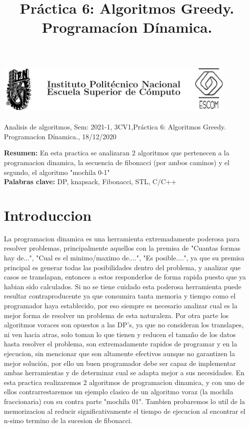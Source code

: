 \documentclass[spanish]{article}
\title {Práctica  6: Algoritmos Greedy. Programacíon Dínamica.}
\begin{document}
	\centerline{\includegraphics[width=450px,height=100px]{header}}
	\centerline{Analisis de algoritmos, Sem: 2021-1, 3CV1,Práctica  6: Algoritmos Greedy. Programacíon Dínamica., 18/12/2020}
	\centerline{}
	\bigskip
	\justify
	\textbf{Resumen:}	
	En esta practica se analizaran 2 algoritmos que pertenecen a la programacion dinamica, la secuencia de fibonacci (por ambos caminos) y el segundo, el algoritmo "mochila 0-1"\\
	\textbf{Palabras clave:}
	DP, knapsack, Fibonacci, STL, C/C++
	\section{Introduccion}
	La programacion dinamica es una herramienta extremadamente poderosa para resolver problemas, principalmente aquellos con la premisa de "Cuantas formas hay de...", "Cual es el minimo/maximo de....", "Es posible....", ya que su premisa principal es generar todas las posibilidades dentro del problema, y analizar que casos se translapan, entonces a estos responderlos de forma rapida puesto que ya habian sido calculados. Si no se tiene cuidado esta poderosa herramienta puede resultar contraproducente ya que consumira tanta memoria y tiempo como el programador haya establecido, por eso siempre es necesario analizar cual es la mejor forma de resolver un problema de esta naturaleza. Por otra parte los algoritmos voraces son opuestos a las DP's, ya que no consideran los translapes, ni ven hacia atras, solo toman lo que tienen y reducen el tamaño de los datos hasta resolver el problema, son extremadamente rapidos de programar y en la ejecucion, sin mencionar que son altamente efectivos aunque no garantizen la mejor solución, por ello un buen programador debe ser capaz de implementar ambas herramientas y de determinar cual se adapta mejor a sus necesidades. En esta practica realizaremos 2 algoritmos de programacion dinamica, y con uno de ellos contrarrestaremos un ejemplo clasico de un algoritmo voraz (la mochila fraccionaria) con su contra parte "mochila 01". Tambien probaremos lo util de la memorizacion al reducir significativamente el tiempo de ejecucion al encontrar el n-simo termino de la sucesion de fibonacci.
\end{document}
